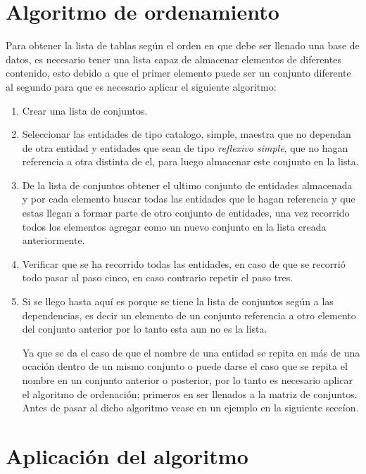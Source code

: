 \section{Algoritmo de ordenamiento}
\label{Algoritmo de ordenamiento}
Para obtener la lista de tablas seg\'un el orden en que debe ser llenado una base de datos,  es necesario tener una lista capaz de almacenar elementos de diferentes contenido, esto debido a que el primer elemento puede ser un conjunto diferente al segundo para que es necesario aplicar el siguiente algoritmo:
\begin{enumerate}
\item Crear una lista de conjuntos.
\item Seleccionar las entidades de tipo catalogo, simple, maestra que no dependan de otra entidad y entidades que sean de tipo \textit{reflexivo simple}, que no hagan referencia a otra distinta de el, para luego almacenar este conjunto en la lista.
\item De la lista de conjuntos obtener el ultimo conjunto de entidades almacenada y por cada elemento buscar todas las entidades que le hagan referencia y que estas llegan a formar parte de otro conjunto de entidades, una vez recorrido todos los elementos agregar como un nuevo conjunto en la lista creada anteriormente.
\item Verificar que se ha recorrido todas las entidades, en caso de que se recorri\'o todo pasar al paso cinco, en caso contrario repetir el paso tres.
\item Si se llego hasta aqu\'i es porque se tiene la lista de conjuntos seg\'un a las dependencias, es decir  
un elemento de un conjunto referencia a otro elemento del conjunto anterior por lo tanto esta aun no es la lista. 

Ya que se da el caso de que el nombre de una entidad se repita en m\'as de una ocaci\'on dentro de un mismo conjunto o puede darse el caso que se repita el nombre en un conjunto anterior o posterior, por lo tanto es necesario aplicar el algoritmo de ordenaci\'on; primeros en ser llenados a la matriz de conjuntos. Antes de pasar al dicho algoritmo vease en un ejemplo en la siguiente secc\'ion.
\end{enumerate}
\section{Aplicaci\'on del algoritmo}


